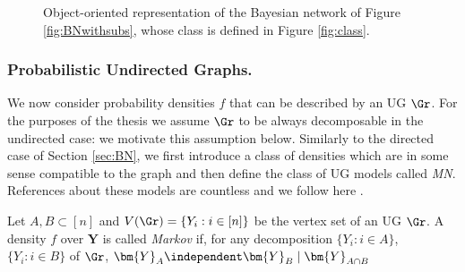 \begin{figure}
\begin{center}
\end{center}
\caption{Object-oriented representation of the Bayesian network of Figure \ref{fig:BNwithsubs}, whose class is defined in Figure \ref{fig:class}. \label{fig:OOBN}}
\end{figure}

\subsubsection{Probabilistic Undirected Graphs.}
We now consider probability densities $f$ that can be described by an \gls{UG} $\Gr$. For the purposes of the thesis we assume $\Gr$ to be always decomposable in the undirected case: we  motivate this assumption below. Similarly to the directed case of Section \ref{sec:BN}, we first introduce a class of densities which are in some sense compatible to the graph and then define the class of \gls{UG} models called \textit{\acrfull{MN}}. References about these models are countless \citep[see e.g.][]{Lauritzen1996a, Cowell1999a, Castillo1997b} and we follow here \citet{Dawid1993}.

\begin{definition}
Let $A,B\subset[n]$ and $V(\Gr)=\{Y_i: i\in[n]\}$ be the vertex set of an \gls{UG} $\Gr$. A density $f$ over $\bm{Y}$ is called \textit{Markov} if, for any decomposition $\{Y_i:i\in A\}$, $\{Y_i:i\in B\}$ of $\Gr$,
$\bm{Y}_A\independent \bm{Y}_B \;|\; \bm{Y}_{A\cap B}$
\end{definition}

